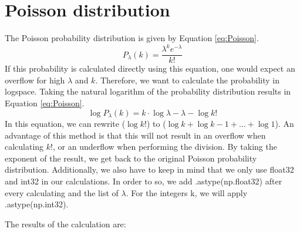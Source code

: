 \section{Poisson distribution}

The Poisson probability distribution is given by Equation \ref{eq:Poisson}. 
\begin{equation}\label{eq:Poisson}
    P_{\lambda}(k) = \frac{\lambda^k e^{-\lambda}}{k!}
\end{equation}
If this probability is calculated directly using this equation, one would expect an overflow for high $\lambda$ and $k$. Therefore, we want to calculate the probability in logspace. Taking the natural logarithm of the probability distribution results in Equation \ref{eq:Poisson}. 
\begin{equation}\label{eq:Poisson}
    \log{P_{\lambda}(k)} = k \cdot \log{\lambda} - \lambda - \log{k!}
\end{equation}
In this equation, we can rewrite ($\log{k!}$) to ($\log{k} + \log{k-1} + ... + \log{1}$). An advantage of this method is that this will not result in an overflow when calculating $k!$, or an underflow when performing the division. By taking the exponent of the result, we get back to the original Poisson probability distribution. Additionally, we also have to keep in mind that we only use float32 and int32 in our calculations. In order to so, we add .astype(np.float32) after every calculating and the list of $\lambda$. For the integers k, we will apply .astype(np.int32). 

The results of the calculation are: 

